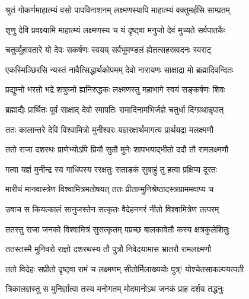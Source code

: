 
\notes{}
\translink{}

\storymeta



\twolineshloka
{श्रुतं गोकर्णमाहात्म्यं वसो पापविनाशनम्}
{लक्ष्मणस्यापि माहात्म्यं वक्तुमर्हसि साम्प्रतम्}%


\twolineshloka
{शृणु देवि प्रवक्ष्यामि माहात्म्यं लक्ष्मणस्य च}
{यं दृष्ट्वा मनुजो देवं मुच्यते सर्वपातकैः}%

\twolineshloka
{चतुर्व्यूहावतारे यो देवः सकर्षणः स्वयय्}
{सर्वभूमण्डलं ह्येतत्सहस्रवदनः स्वराट्}%

\twolineshloka
{एकस्मिञ्छिरसि न्यस्तं नावैत्सिद्धार्थकोपमम्}
{देवो नारायणः साक्षाद्रा मो ब्रह्मादिवन्दितः}%

\twolineshloka
{प्रद्युम्नो भरतो भद्रे शत्रुघ्नो ह्यनिरुद्धकः}
{लक्ष्मणस्तु महाभागे स्वयं सङ्कर्षणः शिवः}%

\twolineshloka
{ब्रह्माद्यैः प्रार्थितः पूर्वं साक्षाद् देवो रमापतिः}
{रामादिनामभिर्जज्ञे चतुर्धा दिग्ग्रथान्नृपात्}%

\twolineshloka
{ततः कालान्तरे देवि विश्वामित्रो मुनीश्वरः}
{यज्ञरक्षार्थमागत्य प्रार्थयद्रा मलक्ष्मणौ}%

\twolineshloka
{ततो राजा दशरथः प्राणेभ्योऽपि प्रियौ सुतौ}
{मुनेः शापभयाद्भीतो ददौ तौ रामलक्ष्मणौ}%

\twolineshloka
{गत्वा यज्ञं मुनीन्द्र स्य गाधिपस्य ररक्षतुः}
{सताडकं सुबाहुं तु हत्वा प्रक्षिप्य दूरतः}%

\twolineshloka
{मारीचं मानवास्त्रेण विश्वामित्रमतोषयत्}
{ततः प्रीतान्मुनिश्रेष्ठादस्त्रग्राममवाप्य च}%

\twolineshloka
{उवाच स कियत्कालं सानुजस्तेन सत्कृतः}
{वैदेहनगरं नीतो विश्वामित्रेण तत्परम्}%

\twolineshloka
{ततस्तु राजा जनको विश्वामित्रं सुसत्कृतम्}
{पप्रच्छ बालकावेतौ कस्य क्षत्रकुलेशितुः}%

\twolineshloka
{ततस्तस्मै मुनिवरो राज्ञो दशरथस्य तौ}
{पुत्रौ निवेदयामास भ्रातरौ रामलक्ष्मणौ}%

\twolineshloka
{ततो विदेहः सप्रीतो दृष्ट्वा रामं च लक्ष्मणम्}
{सीतोर्मिलाख्ययोः पुत्र्! योश्चेतसाकल्पयत्पती}%

\twolineshloka
{त्रिकालज्ञस्तु स मुनिर्ज्ञात्वा तस्य मनोगतम्}
{मोदमानोऽथ जनकं प्राह दर्शय तद्धनुः}%

